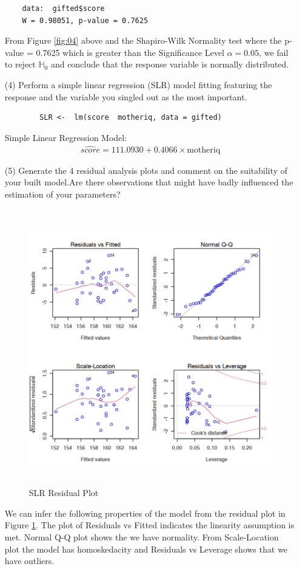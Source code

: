 \documentclass[12pt,a4paper]{article}
\begin{document}
\begin{enumerate}
\begin{verbatim}
	data:  gifted$score
	W = 0.98051, p-value = 0.7625
\end{verbatim}
From Figure \ref{fig:04} above and the Shapiro-Wilk Normality test where the p-value = 0.7625 which is greater than the Significance Level $\alpha = 0.05$,  we fail to reject $\mathbb{H}_0$ and conclude that the response variable is normally distributed.
\item[(4)] Perform a simple linear regression (SLR) model fitting featuring the response and the variable you singled out as the most important.\\
\begin{verbatim}
		SLR <-  lm(score  motheriq, data = gifted)
\end{verbatim}
Simple Linear Regression Model: 
\begin{align*}
		\hat{score} = 111.0930 + 0.4066 \times  \text{motheriq}
\end{align*}
\item[(5)] Generate the 4 residual analysis plots and comment on the suitability of your built model.Are there observations that might have badly influenced the estimation of your parameters?
			\begin{figure}[!h]
				\includegraphics[width=460pt,height=340pt]{./graphics/q45.png}
				\caption{SLR Residual Plot}
				\label{fig:05}
		\end{figure}
We can infer the following properties of the model from the residual plot in Figure \ref{fig:05}. The plot of Residuals vs Fitted indicates the linearity assumption is met.  Normal Q-Q plot shows the we have normality.  From Scale-Location plot the model has homoskedacity and Residuals vs Leverage shows that we have outliers.

\end{enumerate}
\end{document}
